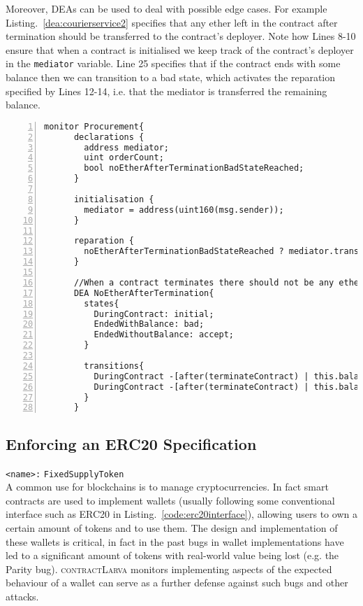 \documentclass{article}
\newcommand{\contractlarva}{\textsc{contractLarva}\xspace}
\newcommand{\tildearrow}{{\raise.37ex\hbox{$\scriptstyle\mathtt{\sim}$}}\hspace{-0.08cm}>\xspace}
\begin{document}
    Moreover, DEAs can be used to deal with possible edge cases. For example Listing.~\ref{dea:courierservice2} specifies that any ether left in the contract after termination should be transferred to the contract's deployer. Note how Lines 8-10 ensure that when a contract is initialised we keep track of the contract's deployer in the \texttt{mediator} variable. Line 25 specifies that if the contract ends with some balance then we can transition to a bad state, which activates the reparation specified by Lines 12-14, i.e. that the mediator is transferred the remaining balance.
    
    \small\begin{lstlisting}[language=DEA,basicstyle=\scriptsize,numbers=left,numbersep=2pt,xleftmargin=0.3cm,escapechar=\%,label={dea:courierservice2},caption={Monitor that checks that when the procurement contract terminates no ether is left in the smart contract.}]
    monitor Procurement{
      declarations {
        address mediator;
        uint orderCount;
        bool noEtherAfterTerminationBadStateReached;
      }
    
      initialisation {
        mediator = address(uint160(msg.sender));
      }
    
      reparation {
        noEtherAfterTerminationBadStateReached ? mediator.transfer(this.balance) : (); 
      }
    
      //When a contract terminates there should not be any ether left in its balance.
      DEA NoEtherAfterTermination{
        states{
          DuringContract: initial;
          EndedWithBalance: bad;
          EndedWithoutBalance: accept;
        }
    
        transitions{
          DuringContract -[after(terminateContract) | this.balance != 0 %$\tildearrow$% noEtherAfterTerminationBadStateReached = true;]-> EndedWithBalance;
          DuringContract -[after(terminateContract) | this.balance == 0]-> EndedWithoutBalance;
        }
      }
        \end{lstlisting}\normalsize
    

   \subsection{Enforcing an ERC20 Specification}
   
          \texttt{<name>:} \verb+FixedSupplyToken+\\
   
   A common use for blockchains is to manage cryptocurrencies. In fact smart contracts are used to implement wallets (usually following some conventional interface such as ERC20 in Listing.~\ref{code:erc20interface}), allowing users to own a certain amount of tokens and to use them. The design and implementation of these wallets is critical, in fact in the past bugs in wallet implementations have led to a significant amount of tokens with real-world value being lost (e.g. the Parity bug). \contractlarva monitors implementing aspects of the expected behaviour of a wallet can serve as a further defense against such bugs and other attacks.
   
\end{document}
